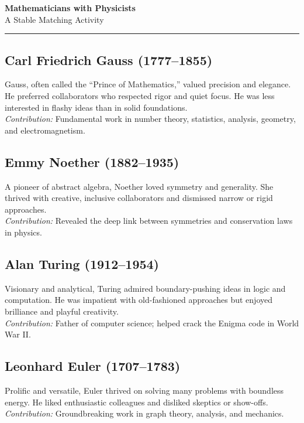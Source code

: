 \documentclass[11pt,a4paper]{article}
\begin{document}
\begin{center}
    {\LARGE \textbf{Mathematicians with Physicists}}\\[0.5em]
    {\large A Stable Matching Activity}\\[0.5em]
    \rule{0.9\linewidth}{0.4pt}
\end{center}

\hrulefill

\subsection*{Carl Friedrich Gauss (1777--1855)}
Gauss, often called the ``Prince of Mathematics,'' valued precision and
elegance. He preferred collaborators who respected rigor and quiet focus. He
was less interested in flashy ideas than in solid foundations.\\
\emph{Contribution:} Fundamental work in number theory, statistics, analysis,
geometry, and electromagnetism.

\subsection*{Emmy Noether (1882--1935)}
A pioneer of abstract algebra, Noether loved symmetry and generality. She
thrived with creative, inclusive collaborators and dismissed narrow or rigid
approaches.\\
\emph{Contribution:} Revealed the deep link between symmetries and conservation
laws in physics.

\subsection*{Alan Turing (1912--1954)}
Visionary and analytical, Turing admired boundary-pushing ideas in logic and
computation. He was impatient with old-fashioned approaches but enjoyed
brilliance and playful creativity.\\
\emph{Contribution:} Father of computer science; helped crack the Enigma code
in World War II.

\subsection*{Leonhard Euler (1707--1783)}
Prolific and versatile, Euler thrived on solving many problems with boundless
energy. He liked enthusiastic colleagues and disliked skeptics or show-offs.\\
\emph{Contribution:} Groundbreaking work in graph theory, analysis, and
mechanics.
\end{document}
